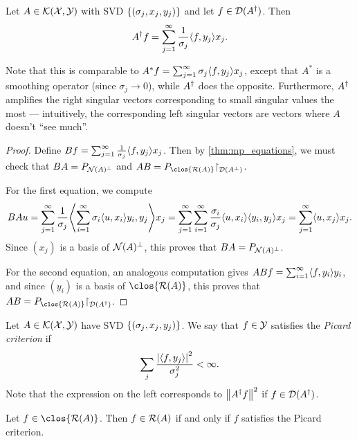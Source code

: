 \begin{theorem}
    Let $A \in \mathcal K(\mathcal X, \mathcal Y)$ with SVD $\qty{(\sigma_j, x_j, y_j)}$ and let $f \in \operatorname{\mathcal D}(A^\dagger)$. Then
    \[
    A^\dagger f = \sum_{j=1}^\infty \frac{1}{\sigma_j} \langle f, y_j\rangle x_j.
    \]
\end{theorem}

\begin{remark}
    Note that this is comparable to $A^* f = \sum_{j=1}^\infty \sigma_j \langle f, y_j\rangle x_j$, except that $A^*$ is a smoothing operator (since $\sigma_j \to 0$), while $A^\dagger$ does the opposite. Furthermore, $A^\dagger$ amplifies the right singular vectors corresponding to small singular values the most --- intuitively, the corresponding left singular vectors are vectors where $A$ doesn't ``see much''. 
\end{remark}

\begin{proof}
    Define $Bf = \sum_{j=1}^\infty \frac1{\sigma_j} \langle f, y_j\rangle x_j$. Then by \cref{thm:mp_equations}, we must check that $BA = P_{\operatorname{\mathcal N}(A)^\perp}$ and $AB = P_{\clos{\Ran(A)}} \restr_{\Dom(A\P)}$. 
    
    For the first equation, we compute
    \[
    BAu = \sum_{j=1}^\infty \frac{1}{\sigma_j} \ang*{\sum_{i=1}^\infty \sigma_i \ang{u, x_i}y_i, y_j} x_j = \sum_{j=1}^\infty \sum_{i=1}^\infty \frac{\sigma_i}{\sigma_j} \ang{u, x_i} \ang{y_i, y_j} x_j = \sum_{j=1}^\infty \ang{u, x_j} x_j . 
    \]
    Since $(x_j)$ is a basis of $\operatorname{\mathcal N}(A)^\perp$, this proves that $BA = P_{\operatorname{\mathcal N}(A)^\perp}$. 
    
    For the second equation, an analogous computation gives $ABf = \sum_{i=1}^\infty \langle f, y_i\rangle y_i$, and since $(y_i)$ is a basis of $\clos{\Ran(A)}$, this proves that $AB = P_{\clos{\Ran(A)}}\restr_{\Dom(A\D)}$. 
\end{proof}

\begin{definition}
    Let $A \in \mathcal K(\mathcal X, \mathcal Y)$ have SVD $\qty{(\sigma_j, x_j, y_j)}$. 
    We say that $f \in \mathcal Y$ satisfies the \emph{Picard criterion} if 
    \[
    \sum_j \frac{\abs{\langle f, y_j\rangle}^2}{\sigma_j^2} < \infty. 
    \]
    Note that the expression on the left corresponds to $\norm{A^\dagger f}^2$ if $f \in \operatorname{\mathcal D}(A^\dagger)$. 
\end{definition}

\begin{theorem}
    Let $f \in \clos{\Ran(A)}$. Then $f \in \operatorname{\mathcal R}(A)$ if and only if $f$ satisfies the Picard criterion. 
\end{theorem}

